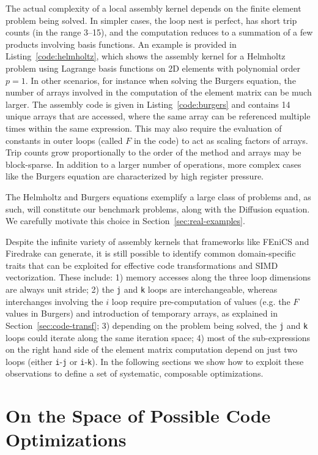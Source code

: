 The actual complexity of a local assembly kernel depends on the finite element problem being solved. In simpler cases, the loop nest is perfect, has short trip counts (in the range 3--15), and the computation reduces to a summation of a few products involving basis functions. An example is provided in Listing~\ref{code:helmholtz}, which shows the assembly kernel for a Helmholtz problem using Lagrange basis functions on 2D elements with polynomial order $p=1$. In other scenarios, for instance when solving the Burgers equation, the number of arrays involved in the computation of the element matrix can be much larger. The assembly code is given in Listing~\ref{code:burgers} and contains 14 unique arrays that are accessed, where the same array can be referenced multiple times within the same expression. This may also require the evaluation of constants in outer loops (called $F$ in the code) to act as scaling factors of arrays. Trip counts grow proportionally to the order of the method and arrays may be block-sparse. In addition to a larger number of operations, more complex cases like the Burgers equation are characterized by high register pressure.

The Helmholtz and Burgers equations exemplify a large class of problems and, as such, will constitute our benchmark problems, along with the Diffusion equation. We carefully motivate this choice in Section~\ref{sec:real-examples}.

Despite the infinite variety of assembly kernels that frameworks like FEniCS and Firedrake can generate, it is still possible to identify common domain-specific traits that can be exploited for effective code transformations and SIMD vectorization. These include: 1) memory accesses along the three loop dimensions are always unit stride; 2) the \texttt{j} and \texttt{k} loops are interchangeable, whereas interchanges involving the $i$ loop require pre-computation of values (e.g. the $F$ values in Burgers) and introduction of temporary arrays, as explained in Section~\ref{sec:code-transf}; 3) depending on the problem being solved, the \texttt{j} and \texttt{k} loops could iterate along the same iteration space; 4) most of the sub-expressions on the right hand side of the element matrix computation depend on just two loops (either \texttt{i}-\texttt{j} or \texttt{i}-\texttt{k}). In the following sections we show how to exploit these observations to define a set of systematic, composable optimizations.

\section{On the Space of Possible Code Optimizations}
